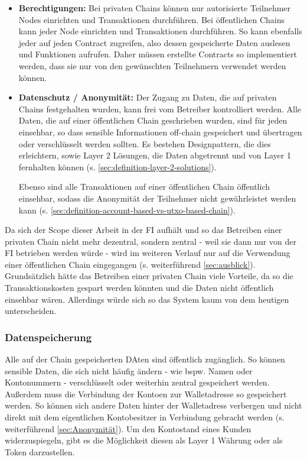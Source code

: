 \documentclass[12pt, a4paper]{article}
\begin{document}
{\begin{itemize}
    Einige Analysen haben gezeigt, dass die Gesamtkosten für den Betrieb einer Anwendung auf einer öffentlichen Chain niedriger sein können als beim Betrieb einer privaten Chain.\footcite[Vgl.][14]{q6}

    \item \textbf{Berechtigungen:}
    Bei privaten Chains können nur autorisierte Teilnehmer Nodes einrichten und Transaktionen durchführen.
    Bei öffentlichen Chains kann jeder Node einrichten und Transaktionen durchführen.
    So kann ebenfalls jeder auf jeden Contract zugreifen, also dessen gespeicherte Daten auslesen und Funktionen aufrufen.
    Daher müssen erstellte Contracts so implementiert werden, dass sie nur von den gewünschten Teilnehmern verwendet werden können.

    \item \textbf{Datenschutz / Anonymität:}
    Der Zugang zu Daten, die auf privaten Chains festgehalten wurden, kann frei vom Betreiber kontrolliert werden. 
    Alle Daten, die auf einer öffentlichen Chain geschrieben wurden, sind für jeden einsehbar, so dass sensible Informationen off-chain gespeichert und übertragen  oder verschlüsselt werden sollten. 
    Es bestehen Designpattern, die dies erleichtern, sowie Layer 2 Lösungen, die Daten abgetrennt und von Layer 1 fernhalten können (s. \ref{sec:definition-layer-2-solutions}).

    Ebenso sind alle Transaktionen auf einer öffentlichen Chain öffentlich einsehbar, sodass die Anonymität der Teilnehmer nicht gewährleistet werden kann (s. \ref{sec:definition-account-based-vs-utxo-based-chain}).
\end{itemize}

\noindent
Da sich der Scope dieser Arbeit in der FI aufhält und so das Betreiben einer privaten Chain nicht mehr dezentral, sondern zentral - weil sie dann nur von der FI betrieben werden würde - wird im weiteren Verlauf nur auf die Verwendung einer öffentlichen Chain eingegangen (s. weiterführend \ref{sec:ausblick}).
Grundsätzlich hätte das Betreiben einer privaten Chain viele Vorteile, da so die Transaktionskosten gespart werden könnten und die Daten nicht öffentlich einsehbar wären.
Allerdings würde sich so das System kaum von dem heutigen unterscheiden.
\subsubsection{Datenspeicherung}
Alle auf der Chain gespeicherten DAten sind öffentlich zugänglich.
So können sensible Daten, die sich nicht häufig ändern - wie bspw. Namen oder Kontonummern - verschlüsselt oder weiterhin zentral gespeichert werden.
Außerdem muss die Verbindung der Kontoen zur Walletadresse so gespeichert werden. 
So können sich andere Daten hinter der Walletadress verbergen und nicht direkt mit dem eigentlichen Kontobesitzer in Verbindung gebracht werden (s. weiterführend \ref{sec:Anonymität}).
Um den Kontostand eines Kunden widerzuspiegeln, gibt es die Möglichkeit diesen als Layer 1 Währung oder als Token darzustellen.

}
\end{document}
